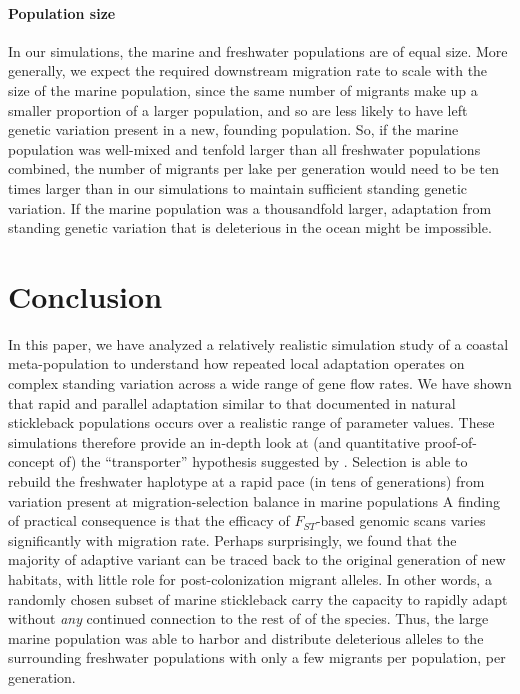 \documentclass{article}
\begin{document}
\paragraph{Population size}
In our simulations,
the marine and freshwater populations are of equal size.
More generally, we expect the required downstream migration rate to scale with the size of the marine population,
since the same number of migrants make up a smaller proportion of a larger population,
and so are less likely to have left genetic variation present in a new, founding population.
So, if the marine population was well-mixed and tenfold larger than all freshwater populations combined,
the number of migrants per lake per generation would need to be ten times larger than in our simulations to maintain sufficient standing genetic variation.
If the marine population was a thousandfold larger,
adaptation from standing genetic variation that is deleterious in the ocean might be impossible.

\section*{Conclusion}

In this paper, we have analyzed a relatively realistic simulation study of a coastal meta-population to 
understand how repeated local adaptation operates on complex standing variation across a wide range of gene flow rates.
We have shown that rapid and parallel adaptation similar to that documented in natural stickleback populations
occurs over a realistic range of parameter values.
These simulations therefore provide an in-depth look at (and quantitative proof-of-concept of)
the ``transporter'' hypothesis suggested by \citet{schluter2009genetics}.
Selection is able to rebuild the freshwater haplotype at a rapid pace (in tens of generations) from variation present at migration-selection balance in marine populations 
A finding of practical consequence is that the efficacy of $F_{ST}$-based genomic scans varies significantly with migration rate.
Perhaps surprisingly, we found
that the majority of adaptive variant can be traced back to the original generation of new habitats,
with little role for post-colonization migrant alleles. 
In other words, a randomly chosen subset of marine stickleback carry the capacity to rapidly adapt without \emph{any} continued connection to the rest of of the species.
Thus, the large marine population was able to harbor and distribute deleterious alleles to the surrounding freshwater populations with only a few migrants per population, per generation. 
\end{document}

